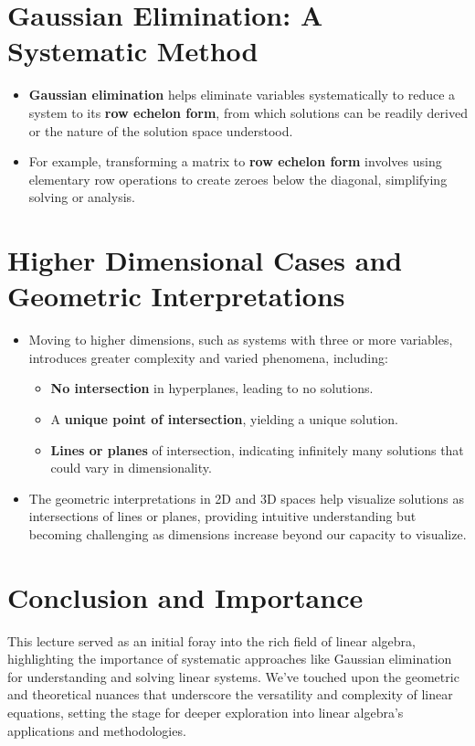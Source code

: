 \documentclass{article}
\begin{document}
\section{Gaussian Elimination: A Systematic Method}

\begin{itemize}
    \item \textbf{Gaussian elimination} helps eliminate variables systematically to reduce a system to its \textbf{row echelon form}, from which solutions can be readily derived or the nature of the solution space understood.
    \item For example, transforming a matrix to \textbf{row echelon form} involves using elementary row operations to create zeroes below the diagonal, simplifying solving or analysis.
\end{itemize}

\section{Higher Dimensional Cases and Geometric Interpretations}

\begin{itemize}
    \item Moving to higher dimensions, such as systems with three or more variables, introduces greater complexity and varied phenomena, including:
    \begin{itemize}
        \item \textbf{No intersection} in hyperplanes, leading to no solutions.
        \item A \textbf{unique point of intersection}, yielding a unique solution.
        \item \textbf{Lines or planes} of intersection, indicating infinitely many solutions that could vary in dimensionality.
    \end{itemize}

    \item The geometric interpretations in 2D and 3D spaces help visualize solutions as intersections of lines or planes, providing intuitive understanding but becoming challenging as dimensions increase beyond our capacity to visualize.
\end{itemize}

\section{Conclusion and Importance}

This lecture served as an initial foray into the rich field of linear algebra, highlighting the importance of systematic approaches like Gaussian elimination for understanding and solving linear systems. We've touched upon the geometric and theoretical nuances that underscore the versatility and complexity of linear equations, setting the stage for deeper exploration into linear algebra's applications and methodologies.
\end{document}
